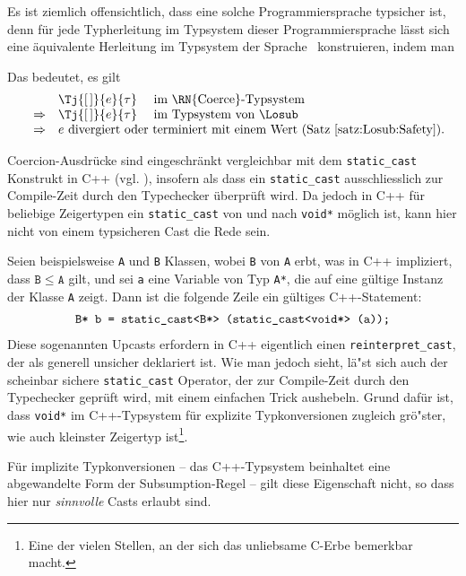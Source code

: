 Es ist ziemlich offensichtlich, dass eine solche Programmiersprache typsicher ist, denn f\"ur jede
Typherleitung im Typsystem dieser Programmiersprache l\"asst sich eine \"aquivalente Herleitung im
Typsystem der Sprache \Losub\ konstruieren, indem man
Das bedeutet, es gilt
\[\begin{array}{rcl}
  &             & \Tj{[\,]}{e}{\tau} \quad \text{ im \RN{Coerce}-Typsystem} \\
  & \Rightarrow & \Tj{[\,]}{e}{\tau} \quad \text{ im Typsystem von \Losub} \\
  & \Rightarrow & e \text{ divergiert oder terminiert mit einem Wert (Satz~\ref{satz:Losub:Safety}).}
\end{array}\]

Coercion-Ausdr\"ucke sind eingeschr\"ankt vergleichbar mit dem {\tt static\_cast} Konstrukt in C++ (vgl.
\cite[S. 440f]{Stroustrup98}), insofern als dass ein {\tt static\_cast} ausschliesslich zur Compile-Zeit
durch den Typechecker \"uberpr\"uft wird. Da jedoch in C++ f\"ur beliebige Zeigertypen ein {\tt static\_cast} 
von und nach {\tt void*} m\"oglich ist, kann hier nicht von einem typsicheren Cast die Rede sein.

Seien beispielsweise {\tt A} und {\tt B} Klassen, wobei {\tt B} von {\tt A} erbt, was in C++ impliziert, dass
$\mathtt{B} \le \mathtt{A}$ gilt, und sei {\tt a} eine Variable von Typ {\tt A*}, die auf eine g\"ultige
Instanz der Klasse {\tt A} zeigt. Dann ist die folgende Zeile ein g\"ultiges C++-Statement:
\[\begin{array}{l}
  \text{\tt B* b = static\_cast<B*> (static\_cast<void*> (a));}
\end{array}\]
Diese sogenannten Upcasts erfordern in C++ eigentlich einen {\tt reinterpret\_cast}, der als generell unsicher
deklariert ist. Wie man jedoch sieht, l\"a"st sich auch der scheinbar sichere {\tt static\_cast} Operator, der
zur Compile-Zeit durch den Typechecker gepr\"uft wird, mit einem einfachen Trick aushebeln. Grund daf\"ur ist,
dass {\tt void*} im C++-Typsystem f\"ur explizite Typkonversionen zugleich gr\"o"ster, wie auch kleinster
Zeigertyp ist\footnote{Eine der vielen Stellen, an der sich das unliebsame C-Erbe bemerkbar macht.}.

F\"ur implizite Typkonversionen -- das C++-Typsystem beinhaltet eine abgewandelte Form der Subsumption-Regel -- gilt
diese Eigenschaft nicht, so dass hier nur {\em sinnvolle} Casts erlaubt sind.


